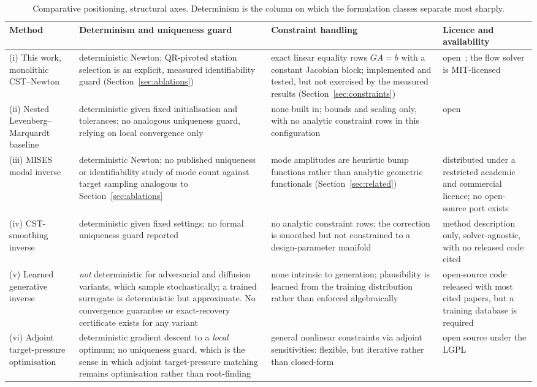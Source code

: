 \begin{table}[p]
\centering
\caption{Comparative positioning, structural axes. Determinism is the column
on which the formulation classes separate most sharply.}
\label{tab:comparison-struct}
\footnotesize
\begin{tabularx}{\textwidth}{@{}>{\raggedright\arraybackslash}p{2.45cm} L L L@{}}
\toprule
Method & Determinism and uniqueness guard & Constraint handling &
Licence and availability \\
\midrule
(i) This work, monolithic CST--Newton &
  deterministic Newton; QR-pivoted station selection is an explicit, measured
  identifiability guard (Section~\ref{sec:ablations}) &
  exact linear equality rows $G A = b$ with a constant Jacobian block;
  implemented and tested, but not exercised by the measured results
  (Section~\ref{sec:constraints}) &
  open~\citep{cinsrepo}; the flow solver is MIT-licensed
  \citep{fidkowski2022coupled} \\
(ii) Nested Levenberg--Marquardt baseline &
  deterministic given fixed initialisation and tolerances; no analogous
  uniqueness guard, relying on local convergence only &
  none built in; bounds and scaling only, with no analytic constraint rows in
  this configuration &
  open~\citep{virtanen2020scipy} \\
(iii) MISES modal inverse &
  deterministic Newton; no published uniqueness or identifiability study of
  mode count against target sampling analogous to Section~\ref{sec:ablations} &
  mode amplitudes are heuristic bump functions rather than analytic geometric
  functionals (Section~\ref{sec:related}) &
  distributed under a restricted academic and commercial licence; no
  open-source port exists \\
(iv) CST-smoothing inverse &
  deterministic given fixed settings; no formal uniqueness guard reported &
  no analytic constraint rows; the correction is smoothed but not constrained
  to a design-parameter manifold &
  method description only, solver-agnostic, with no released code cited \\
(v) Learned generative inverse &
  \emph{not} deterministic for adversarial and diffusion variants, which
  sample stochastically; a trained surrogate is deterministic but
  approximate. No convergence guarantee or exact-recovery certificate exists
  for any variant &
  none intrinsic to generation; plausibility is learned from the training
  distribution rather than enforced algebraically &
  open-source code released with most cited papers, but a training database is
  required \\
(vi) Adjoint target-pressure optimisation &
  deterministic gradient descent to a \emph{local} optimum; no uniqueness
  guard, which is the sense in which adjoint target-pressure matching remains
  optimisation rather than root-finding &
  general nonlinear constraints via adjoint sensitivities: flexible, but
  iterative rather than closed-form &
  open source under the LGPL~\citep{economon2016su2} \\
\bottomrule
\end{tabularx}
\end{table}

